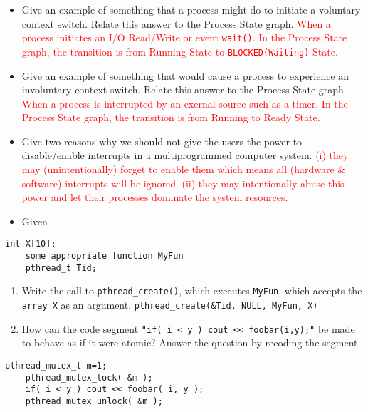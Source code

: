 \documentclass[10pt,landscape]{article}
\newcommand{\answer}[1]{\textcolor{red}{#1}}
\begin{document}
\begin{multicols}{4}
\begin{itemize}
    \item Give an example of something that a process might do to initiate a voluntary context switch.  Relate this answer to the Process State graph. \answer{When a process initiates an I/O Read/Write or event \texttt{wait()}. In the Process State graph, the transition is from Running State to \texttt{BLOCKED(Waiting)} State.}
    \item Give an example of something that would cause a process to experience an involuntary context switch.  Relate this answer to the Process State graph.  \answer{When a process is interrupted by an exernal source such as a timer.  In the Process State graph, the transition is from Running to Ready State.}
    \item Give two reasons why we should not give the users the power to disable/enable interrupts in a multiprogrammed computer system.  \answer{(i) they may (unintentionally) forget to enable them which means all (hardware \& software) interrupts will be ignored.  (ii) they may intentionally abuse this power and let their processes dominate the system resources.}
    \item Given
\end{itemize}

\begin{lstlisting}[style=cC++]
    int X[10];
    some appropriate function MyFun
    pthread_t Tid;
\end{lstlisting}
\begin{enumerate}
    \item Write the call to \verb$pthread_create()$, which executes \verb$MyFun$, which accepts the \verb$array X$ as an argument. \verb$pthread_create(&Tid, NULL, MyFun, X)$
    \item How can the code segment \verb$"if( i < y ) cout << foobar(i,y);"$ be made to behave as if it were atomic? Answer the question by recoding the segment.
\end{enumerate}
\begin{lstlisting}[style=cC++]
    pthread_mutex_t m=1;
    pthread_mutex_lock( &m );
    if( i < y ) cout << foobar( i, y );
    pthread_mutex_unlock( &m );
\end{lstlisting}


\end{multicols}
\end{document}
